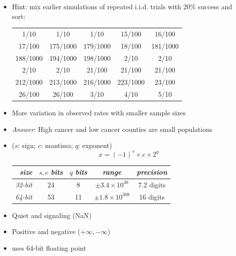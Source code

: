 \documentclass[10pt]{report}
\begin{document}
%
\begin{itemize}
\item Hint: mix earlier simulations of repeated i.i.d. trials with 20\% success and sort:
{\footnotesize
\begin{center}
\begin{tabular}{ccccc}
1/10 &  1/10 &  1/10 &  15/100 &  16/100
\\
17/100 &  175/1000 &  179/1000 &  18/100 &  181/1000
\\
188/1000 &  194/1000 &  198/1000 & 2/10 &  2/10
\\
2/10 &  2/10 & 21/100 &  21/100 &  21/100
\\
212/1000 &  213/1000 &   216/1000 &   223/1000 &  23/100
\\
26/100 &  26/100 &  3/10 &  4/10 &  5/10
\end{tabular}
\end{center}
}
\item More variation in observed rates with smaller sample sizes
\vfill
\item \emph{Answer}: High cancer and low cancer counties are small populations
\end{itemize}



%
\begin{itemize}
\item {} ($s$: sign; $c$: mantissa; $q$: exponent)
{\large
\[
x = (-1)^s \times c \times 2^q
\]
}
\begin{center}
\begin{tabular}{r|c|c|cc}
{\slshape size} & $s, c$ {\slshape bits} & $q$ {\slshape bits}
& {\slshape range} & {\slshape precision}
\\ \hline
{\slshape 32-bit} & 24 & 8
& $\pm 3.4 \times 10^{38}$ & 7.2 digits
\\[4pt]
{\slshape 64-bit} & 53 & 11
& $\pm 1.8 \times 10^{308}$ & 16 digits
\end{tabular}
\end{center}
\item Quiet and signaling  (NaN)
\item Positive and negative  ($+\infty, -\infty$)
\item {} uses 64-bit floating point
\end{itemize}
\end{document}
